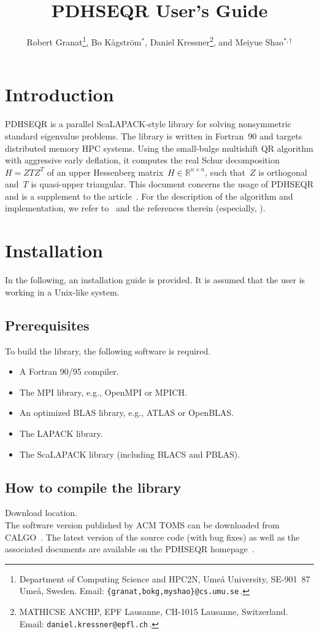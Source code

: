 \documentclass{article}
\title{PDHSEQR User's Guide}
\author{Robert Granat\thanks{
Department of Computing Science and HPC2N,
Ume{\aa} University,
SE-901~87 Ume{\aa}, Sweden.
Email: \texttt{\{granat,bokg,myshao\}@cs.umu.se}\,.},
Bo K{\aa}gstr\"om$^*$,
Daniel Kressner\thanks{
MATHICSE ANCHP,
EPF Lausanne,
CH-1015 Lausanne, Switzerland.
Email: \texttt{daniel.kressner@epfl.ch}\,.},
and Meiyue Shao$^{*,\dagger}$}
\begin{document}
\maketitle

\section{Introduction}
PDHSEQR is a parallel ScaLAPACK-style library for solving nonsymmetric
standard eigenvalue problems.
The library is written in Fortran~90 and targets distributed memory HPC systems.
Using the small-bulge multishift QR
algorithm with aggressive early deflation,
it computes the real Schur decomposition $H=ZTZ^T$ of an upper Hessenberg
matrix~$H\in\mathbb{R}^{n\times n}$, such that~$Z$ is orthogonal and~$T$ is
quasi-upper triangular.
This document concerns the usage of PDHSEQR and is a supplement to the
article~\cite{GKKS2013}.
For the description of the algorithm and implementation, we refer
to~\cite{GKKS2013} and the references therein (especially,
\cite{BBM2002a,BBM2002b,GKK2009,GKK2010,KKS2012}).

\section{Installation}
In the following, an installation guide is provided.
It is assumed that the user is working in a Unix-like system.

\subsection{Prerequisites}
To build the library, the following software is required.
\begin{itemize}
\item A Fortran 90/95 compiler.
\item The MPI library, e.g., OpenMPI or MPICH.
\item An optimized BLAS library, e.g., ATLAS or OpenBLAS.
\item The LAPACK library.
\item The ScaLAPACK library (including BLACS and PBLAS).
\end{itemize}

\subsection{How to compile the library}
\begin{paragraph}
{Download location.}~\\
The software version published by ACM TOMS can be downloaded from CALGO~\cite{CALGO}.
The latest version of the source code (with bug fixes) as well as the
associated documents are available on the PDHSEQR homepage~\cite{home}.
\end{paragraph}
\end{document}
